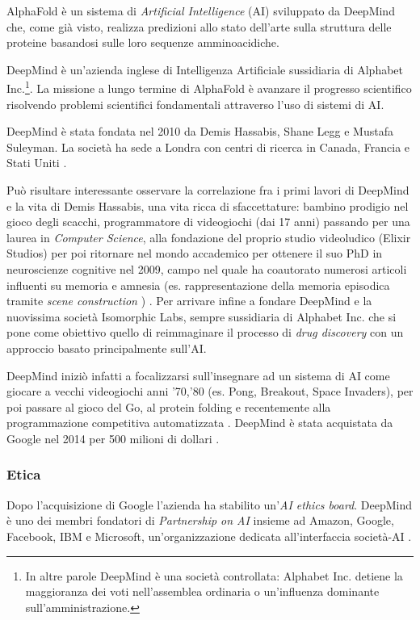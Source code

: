 {
	AlphaFold è un sistema di \textit{Artificial Intelligence }(AI) sviluppato da DeepMind che, come già visto, realizza predizioni allo stato dell'arte sulla struttura delle proteine basandosi sulle loro sequenze amminoacidiche.
	
	\par DeepMind è un'azienda inglese di Intelligenza Artificiale sussidiaria di Alphabet Inc.\footnote{In altre parole DeepMind è una società controllata: Alphabet Inc. detiene la maggioranza dei voti nell'assemblea ordinaria o un'influenza dominante sull'amministrazione.}. La missione a lungo termine di AlphaFold è avanzare il progresso scientifico risolvendo problemi scientifici fondamentali attraverso l'uso di sistemi di AI.
	
	\par DeepMind è stata fondata nel 2010 da Demis Hassabis, Shane Legg e Mustafa Suleyman. La società ha sede a Londra con centri di ricerca in Canada, Francia e Stati Uniti \supercite{deepMindWiki}.
	
	\par Può risultare interessante osservare la correlazione fra i primi lavori di DeepMind e la vita di Demis Hassabis, una vita ricca di sfaccettature: bambino prodigio nel gioco degli scacchi, programmatore di videogiochi (dai 17 anni) passando per una laurea in \textit{Computer Science}, alla fondazione del proprio studio videoludico (Elixir Studios) per poi ritornare nel mondo accademico per ottenere il suo PhD in neuroscienze cognitive nel 2009, campo nel quale ha coautorato numerosi articoli influenti su memoria e amnesia (es. rappresentazione della memoria episodica tramite \textit{scene construction} \supercite{Hassabis2007Jul}) \supercite{hassabisWiki}. Per arrivare infine a fondare DeepMind e la nuovissima società Isomorphic Labs, sempre sussidiaria di Alphabet Inc. che si pone come obiettivo quello di reimmaginare il processo di \textit{drug discovery} con un approccio basato principalmente sull'AI.
	
	\par DeepMind iniziò infatti a focalizzarsi sull'insegnare ad un sistema di AI come giocare a vecchi videogiochi anni '70,'80 (es. Pong, Breakout, Space Invaders), per poi passare al gioco del Go, al protein folding e recentemente alla programmazione competitiva automatizzata \supercite{competitiveProgrDeepMind}.
	DeepMind è stata acquistata da Google nel 2014 per 500 milioni di dollari \supercite{Guardian2014}.
	
	\subsubsection{Etica}
	Dopo l'acquisizione di Google l'azienda ha stabilito un'\textit{AI ethics board}. DeepMind è uno dei membri fondatori di \textit{Partnership on AI} insieme ad Amazon, Google, Facebook, IBM e Microsoft, un'organizzazione dedicata all'interfaccia società-AI \supercite{partnershiponai}.
	
}
